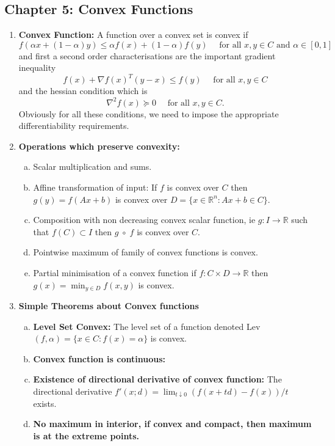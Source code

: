 \documentclass{article}
\begin{document}
\subsection*{Chapter 5: Convex Functions}
\begin{enumerate}
    \item \textbf{Convex Function:} A function over a convex set is convex if
    \[
    f(\alpha x + (1-\alpha)y) \leq \alpha f(x) + (1- \alpha) f(y) \quad \text{ for all } x, y \in C \text{ and } \alpha \in [0,1]
    \]
    and first a second order characterisations are the important gradient inequality
    \[
    f(x) + \nabla f(x)^T(y- x) \leq f(y) \quad \text{ for all } x, y \in C
    \]
    and the hessian condition which is
    \[
    \nabla^2 f(x) \succeq 0 \quad \text{ for all } x, y \in C.
    \]
    Obviously for all these conditions, we need to impose the appropriate differentiability requirements.
    \item \textbf{Operations which preserve convexity:}
    \begin{enumerate} [a.]
        \item Scalar multiplication and sums.
        \item Affine transformation of input: If \(f\) is convex over \(C\) then \(g(y) = f(Ax+b)\) is convex over \(D = \{x \in \mathbb{R}^n: Ax+b \in C\}\).
        \item Composition with non decreasing convex scalar function, ie \(g:I \to \mathbb{R}\) such that \(f(C) \subset I\) then \(g\; \circ \;f\) is convex over \(C\).
        \item Pointwise maximum of family of convex functions is convex.
        \item Partial minimisation of a convex function if \(f: C\times D \to \mathbb{R}\) then \(g(x) = \min_{y\in D}f(x,y)\) is convex.
    \end{enumerate}
    \item \textbf{Simple Theorems about Convex functions}
    \begin{enumerate} [a.]
        \item \textbf{Level Set Convex:} The level set of a function denoted Lev\((f, \alpha) = \{x\in C:f(x)=\alpha\}\) is convex.
        \item \textbf{Convex function is continuous:} 
        \item \textbf{Existence of directional derivative of convex function:} The directional derivative \(f'(x;d) = \lim_{t \downarrow 0} (f(x+td) -f(x))/t\) exists.
        \item \textbf{No maximum in interior, if convex and compact, then maximum is at the extreme points.}
    \end{enumerate}
\end{enumerate}
\end{document}
